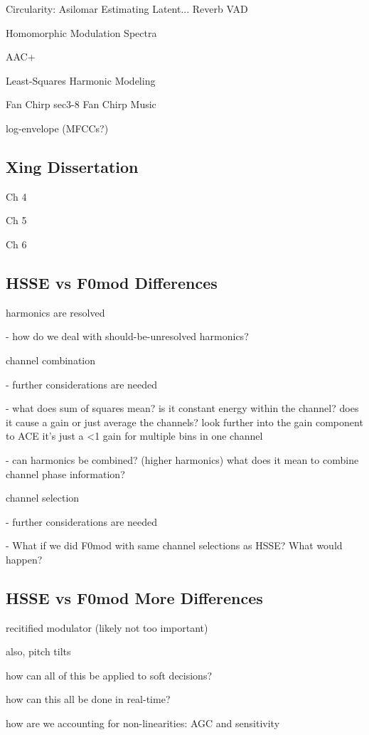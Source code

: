 \documentclass [11pt, proquest] {uwthesis}[2015/03/03]
\begin{document}
Circularity:
Asilomar
Estimating Latent...
Reverb
VAD

Homomorphic Modulation Spectra

AAC+

Least-Squares Harmonic Modeling

Fan Chirp sec3-8
Fan Chirp Music

log-envelope (MFCCs?)

\subsection{Xing Dissertation}

Ch 4

Ch 5

Ch 6

\subsection{HSSE vs F0mod Differences}

harmonics are resolved

 - how do we deal with should-be-unresolved harmonics?

channel combination

 - further considerations are needed

 - what does sum of squares mean? is it constant energy within the channel?  does it cause a gain or just average the channels?  look further into the gain component to ACE
 	it's just a <1 gain for multiple bins in one channel

 - can harmonics be combined? (higher harmonics) what does it mean to combine channel phase information?

channel selection

 - further considerations are needed

 - What if we did F0mod with same channel selections as HSSE?  What would happen?

\subsection{HSSE vs F0mod More Differences}

recitified modulator (likely not too important)

also, pitch tilts

how can all of this be applied to soft decisions?

how can this all be done in real-time?

how are we accounting for non-linearities: AGC and sensitivity
\end{document}
